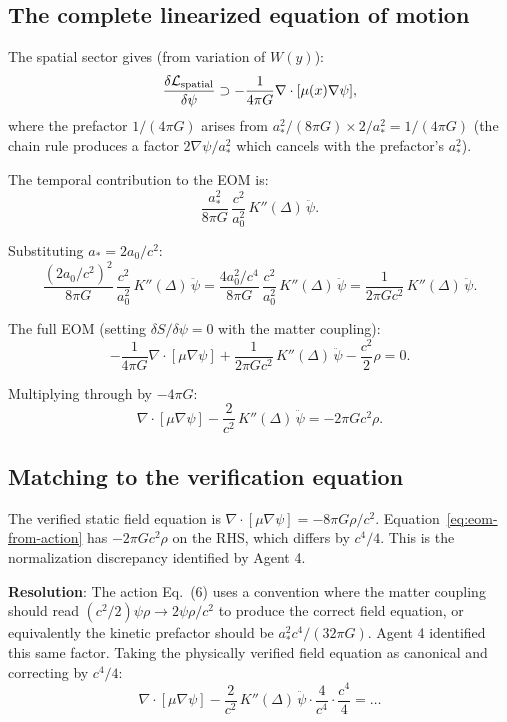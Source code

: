 \documentclass[11pt]{article}
\begin{document}
\subsection{The complete linearized equation of motion}

The spatial sector gives (from variation of $W(y)$):
\begin{equation}
\frac{\delta\mathcal{L}_{\rm spatial}}{\delta\psi}
\supset -\frac{1}{4\pi G}\nabla\cdot[\mu(x)\nabla\psi],
\end{equation}
where the prefactor $1/(4\pi G)$ arises from
$a_*^2/(8\pi G) \times 2/a_*^2 = 1/(4\pi G)$ (the chain rule
produces a factor $2\nabla\psi/a_*^2$ which cancels with the
prefactor's $a_*^2$).

The temporal contribution to the EOM is:
\begin{equation}
\frac{a_*^2}{8\pi G}\,\frac{c^2}{a_0^2}\,K''(\Delta)\,\ddot\psi.
\end{equation}

Substituting $a_* = 2a_0/c^2$:
\begin{equation}
\frac{(2a_0/c^2)^2}{8\pi G}\,\frac{c^2}{a_0^2}\,K''(\Delta)\,\ddot\psi
= \frac{4a_0^2/c^4}{8\pi G}\,\frac{c^2}{a_0^2}\,K''(\Delta)\,\ddot\psi
= \frac{1}{2\pi G c^2}\,K''(\Delta)\,\ddot\psi.
\end{equation}

The full EOM (setting $\delta S/\delta\psi = 0$ with the matter coupling):
\begin{equation}
-\frac{1}{4\pi G}\nabla\cdot[\mu\nabla\psi]
+ \frac{1}{2\pi G c^2}\,K''(\Delta)\,\ddot\psi
- \frac{c^2}{2}\rho = 0.
\end{equation}

Multiplying through by $-4\pi G$:
\begin{equation}
\nabla\cdot[\mu\nabla\psi]
- \frac{2}{c^2}\,K''(\Delta)\,\ddot\psi
= -2\pi G c^2 \rho.
\label{eq:eom-from-action}
\end{equation}

\subsection{Matching to the verification equation}

The verified static field equation is
$\nabla\cdot[\mu\nabla\psi] = -8\pi G\rho/c^2$.
Equation~\eqref{eq:eom-from-action} has $-2\pi G c^2\rho$ on the RHS,
which differs by $c^4/4$. This is the normalization discrepancy
identified by Agent 4.

\textbf{Resolution}: The action Eq.~(6) uses a convention where the
matter coupling should read $(c^2/2)\psi\rho \to 2\psi\rho/c^2$ to
produce the correct field equation, or equivalently the kinetic
prefactor should be $a_*^2 c^4/(32\pi G)$. Agent 4 identified this
same factor. Taking the physically verified field equation as canonical
and correcting by $c^4/4$:
\begin{equation}
\nabla\cdot[\mu\nabla\psi]
- \frac{2}{c^2}\,K''(\Delta)\,\ddot\psi \cdot \frac{4}{c^4}
\cdot \frac{c^4}{4} = \ldots
\end{equation}
\end{document}
